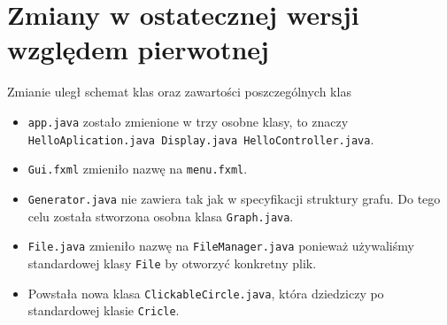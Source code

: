 \documentclass{article}
\begin{document}
\section{Zmiany w ostatecznej wersji względem pierwotnej}
Zmianie uległ schemat klas oraz zawartości poszczególnych klas
\begin{itemize}
    \item \texttt{\footnotesize app.java} zostało zmienione w trzy osobne klasy, to znaczy \texttt{\footnotesize HelloAplication.java Display.java HelloController.java}.
    
    \item \texttt{\footnotesize Gui.fxml} zmieniło nazwę na \texttt{\footnotesize menu.fxml}.
    
    \item \texttt{\footnotesize Generator.java} nie zawiera tak jak w specyfikacji struktury grafu. Do tego celu została stworzona osobna klasa \texttt{\footnotesize Graph.java}.
    
    \item \texttt{\footnotesize File.java} zmieniło nazwę na \texttt{\footnotesize FileManager.java} ponieważ używaliśmy standardowej klasy \texttt{\footnotesize File} by otworzyć konkretny plik.
    
    \item Powstała nowa klasa \texttt{\footnotesize ClickableCircle.java}, która dziedziczy po standardowej klasie \texttt{\footnotesize Cricle}.
\end{itemize}
\end{document}
